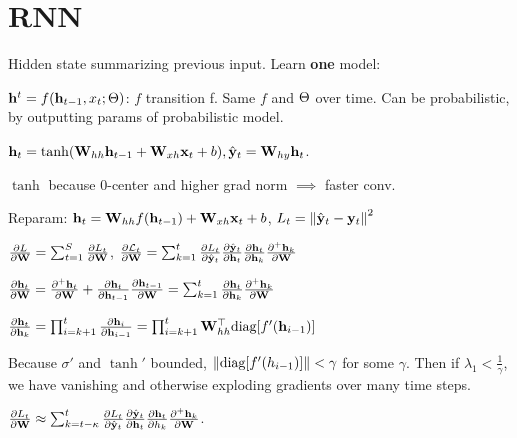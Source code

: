 \section{RNN}

Hidden state summarizing previous input. Learn \textbf{one} model:

\(\vb{h}^t = f(\vb{h}_{t-1}, x_t; \Theta)\): \(f\) transition f. Same \(f\) and \(\Theta\) over time.
Can be probabilistic, by outputting params of probabilistic model.

\begin{definition}
    \(\vb{h}_t = \tanh(\vb{W}_{hh}\vb{h}_{t - 1} + \vb{W}_{xh}\vb{x}_t + b), \hat{\vb{y}}_t = \vb{W}_{hy} \vb{h}_t\).
    \begin{itemize*}
        \item \(\tanh\) because 0-center and higher grad norm \(\implies\) faster conv.
        \item Reparam: \(\vb{h}_t = \vb{W}_{hh} f(\vb{h}_{t-1}) + \vb{W}_{xh}\vb{x}_t + b\), \(L_t = \norm{\hat {\vb{y}}_t - \vb{y}_t}^2\)
    \end{itemize*}
\end{definition}

\begin{definition}[BPTT]
    \(\frac{\partial L}{\partial \vb{W}} = \sum_{t=1}^S \frac{\partial L_t}{\partial \vb{W}}\), 
    \(\frac{\partial \mathcal{L}_t}{\partial \vb{W}} = \sum_{k=1}^t \frac{\partial L_t}{\partial \hat{\vb{y}}_t} \frac{\partial \hat{\vb{y}}_t}{\partial \vb{h}_t} \frac{\partial \vb{h}_t}{\partial \vb{h}_k} \frac{\partial^+ \vb{h}_k}{\partial \vb{W}}\)

    \(\frac{\partial \vb{h}_t}{\partial \vb{W}} = \frac{\partial^+ \vb{h}_t}{\partial \vb{W}} + \frac{\partial \vb{h}_t}{\partial \vb{h}_{t-1}}\frac{\partial \vb{h}_{t-1}}{\partial \vb{W}} = \sum_{k=1}^t\frac{\partial \vb{h}_t}{\partial \vb{h}_k} \frac{\partial^+\vb{h}_k}{\partial \vb{W}}\)
    
    \(\frac{\partial \vb{h}_t}{\partial \vb{h}_k} = \prod_{i = k+1}^t \frac{\partial \vb{h}_i}{\partial \vb{h}_{i-1}} = \prod_{i = k+1}^t \vb{W}_{hh}^\top \text{diag}[f'(\vb{h}_{i-1})]\)
\end{definition}

\begin{definition}
    Because \(\sigma'\) and \(\tanh'\) bounded, \(\norm{\text{diag}[f'(h_{i-1})]} < \gamma\) for some \(\gamma\). Then if \(\lambda_1 < \frac{1}{\gamma}\), we have vanishing and otherwise exploding gradients over many time steps.
\end{definition}

\begin{definition}
    \(\frac{\partial L_t}{\partial \vb{W}} \approx \sum_{k = t - \kappa}^t \frac{\partial L_t}{\partial \hat{\vb{y}}_t} \frac{\partial \hat{\vb{y}}_t}{\partial \vb{h}_t}\frac{\partial \vb{h}_t}{\partial h_k}\frac{\partial^+ \vb{h}_k}{\partial \vb{W}}\).
\end{definition}

